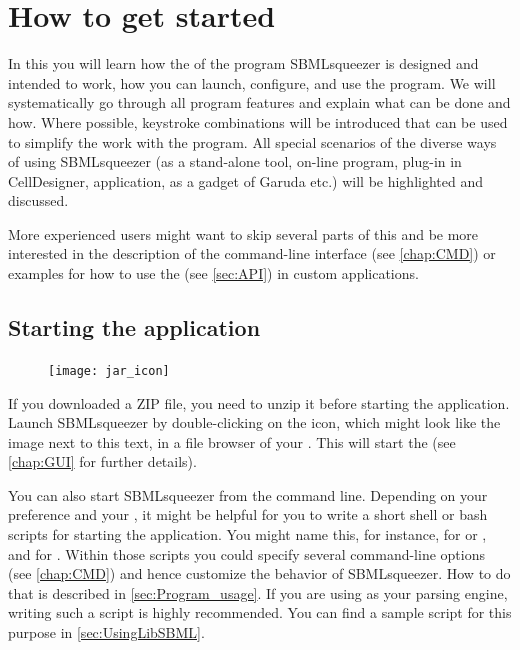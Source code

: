 
\chapter{How to get started}
\label{chap:GUI}

In this  you will learn how the \GUI of the program
SBMLsqueezer is designed and intended to work, how you can launch, configure,
and use the program.
We will systematically go through all program features and explain what can be done and how.
Where possible, keystroke combinations will be introduced that can be used to simplify the work with the program.
All special scenarios of the diverse ways of using SBMLsqueezer (as a stand-alone tool, on-line program, plug-in in CellDesigner, \JavaWebStart application, as a gadget of Garuda etc.) will be highlighted and discussed.

More experienced users might want to skip several parts of this  and be more interested in the description of the command-line interface (see \vref{chap:CMD}) or examples for how to use the \API (see \vref{sec:API}) in custom applications.

\section{Starting the application}
\label{startingTheProgram}

\begin{figure}
\vspace{\wrapfigspace}
\texttt{[image: jar\_icon]}
\end{figure}
If you downloaded a ZIP file, you need to unzip it before starting the application.
Launch SBMLsqueezer by double-clicking on the \Java icon, which might look like the
image next to this text, in a file browser of your \OS.
This will start the \GUI (see \vref{chap:GUI} for further details).

You can also start SBMLsqueezer from the command line.
Depending on your preference and your \OS, it might be helpful for
you to write a short shell or bash scripts for starting the application.
You might name this, for instance,  for \Linux or \MacOSX, and
 for \Windows. Within those scripts you could specify several
command-line options (see \vref{chap:CMD}) and hence customize the behavior of SBMLsqueezer.
How to do that is described in \vref{sec:Program_usage}.
If you are using \libSBML as your \SBML parsing engine, writing such a script is highly recommended.
You can find a sample script for this purpose in \vref{sec:UsingLibSBML}.

